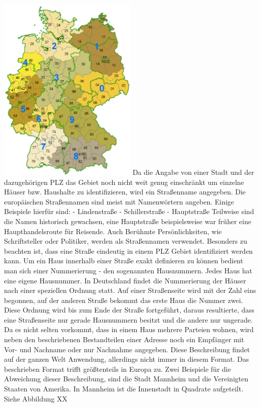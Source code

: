 \includegraphics[width=0.50\textwidth]{ref/images/plzgebiete.png}
Da die Angabe von einer Stadt und der dazugehörigen PLZ das Gebiet noch nicht weit genug einschränkt um einzelne Häuser bzw. Haushalte zu identifizieren, wird ein Straßenname angegeben.
Die europäischen Straßennamen sind meist mit Namenwörtern angeben.
Einige Beispiele hierfür sind:
-	Lindenstraße
-	Schillerstraße
-	Hauptstraße
Teilweise sind die Namen historisch gewachsen, eine Hauptstraße beispielsweise war früher eine Haupthandelsroute für Reisende. Auch Berühmte Persönlichkeiten, wie Schriftsteller oder Politiker, werden als Straßennamen verwendet. Besonders zu beachten ist, dass eine Straße eindeutig in einem PLZ Gebiet identifiziert werden kann.
Um ein Haus innerhalb einer Straße exakt definieren zu können bedient man sich einer Nummerierung - den sogenannten Hausnummern. Jedes Haus hat eine eigene Hausnummer. 
In Deutschland findet die Nummerierung der Häuser nach einer speziellen Ordnung statt. Auf einer Straßenseite wird mit der Zahl eins begonnen, auf der anderen Straße bekommt das erste Haus die Nummer zwei. Diese Ordnung wird bis zum Ende der Straße fortgeführt, daraus resultierte, dass eine Straßenseite nur gerade Hausnummern besitzt und die andere nur ungerade.
Da es nicht selten vorkommt, dass in einem Haus mehrere Parteien wohnen, wird neben den beschriebenen Bestandteilen einer Adresse noch ein Empfänger mit Vor- und Nachname oder nur Nachnahme angegeben.
Diese Beschreibung findet auf der ganzen Welt Anwendung, allerdings nicht immer in diesem Format. Das beschrieben Format trifft größtenteils in Europa zu. Zwei Beispiele für die Abweichung dieser Beschreibung, sind die Stadt Mannheim und die Vereinigten Staaten von Amerika.
In Mannheim ist die Innenstadt in Quadrate aufgeteilt. Siehe Abbildung XX 

